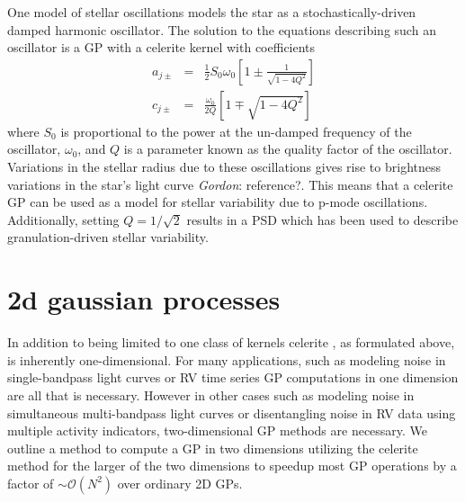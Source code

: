 \documentclass[preprint2]{aastex62}
\newcommand{\todo}[3]{{\color{#2}\emph{#1}: #3}}
\newcommand{\gordontodo}[1]{\todo{Gordon}{red}{#1}}
\newcommand{\project}[1]{\textsf{#1}}
\newcommand{\celerite}{\project{celerite }}
\begin{document}
		One model of stellar oscillations models the star as a stochastically-driven damped harmonic oscillator\citep{Anderson1990}. The solution to the equations describing 
		such an oscillator is a GP with a \celerite kernel with coefficients 
		\begin{eqnarray}
			a_{j\pm} &=& \frac{1}{2}S_0\omega_0\left[1\pm\frac{1}{\sqrt{1-4Q^2}}\right] \\
			c _{j\pm}&=& \frac{\omega_0}{2Q}\left[1 \mp \sqrt{1-4Q^2}\right]
		\end{eqnarray}
		where $S_0$ is proportional to the power at the un-damped frequency of the oscillator, $\omega_0$, and $Q$ is a parameter known as 
		the quality factor of the oscillator. Variations in the stellar radius due to these oscillations gives rise to brightness variations in the star's 
		light curve \gordontodo{reference?}. 
		This means that a \celerite GP can be used as a model for stellar variability due 
		to p-mode oscillations. Additionally, setting $Q=1/\sqrt{2}$ results in a PSD 
		which has been used to describe granulation-driven stellar variability\citep{Kallinger2014}.

\section{2d gaussian processes}
	In addition to being limited to one class of kernels \celerite, as formulated above, is inherently one-dimensional. For many applications, such 
	as modeling noise in single-bandpass light curves or RV time series GP computations in one dimension are all that is necessary. However in 
	other cases such as modeling noise in simultaneous multi-bandpass light curves or disentangling noise in RV data using multiple activity 
	indicators, two-dimensional GP methods are necessary. We outline a method to compute a GP in two dimensions utilizing the \celerite 
	method for the larger of the two dimensions to speedup most GP operations by a factor of $\sim\mathcal{O}(N^2)$ over ordinary 2D GPs. 
	
\end{document}
